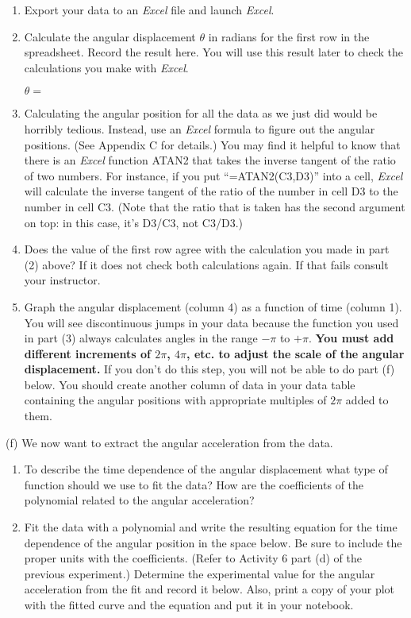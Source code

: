 \begin{enumerate}
\item Export your data to an \textit{Excel} file and launch 
\textit{Excel}.

\item Calculate the angular displacement \( \theta  \) in radians for the first row
in the spreadsheet. Record the result here.
You will use this result later to check the calculations you make with 
\textit{Excel}.


$\theta =$

\item Calculating the angular position for all the data as we just did
would be horribly tedious. Instead, use an {\it Excel} formula to
figure out the angular positions.  (See Appendix C for details.)
You may find it helpful to know that there is an {\it Excel} function
ATAN2 that takes the inverse tangent of the ratio of two numbers.
For instance, if you put ``=ATAN2(C3,D3)'' into a cell, {\it Excel}
will calculate the inverse tangent of the ratio of the number
in cell D3 to the number in cell C3.  (Note that the ratio
that is taken has the second argument on top: in this case, it's 
D3/C3, not C3/D3.)

\item Does the value of the first row agree with the calculation you made in part
(2) above? If it does not check both calculations again. If that fails consult
your instructor. 
\item Graph the angular displacement (column 4) as a function of time (column 1).
You will see discontinuous jumps in your data because the function you used
in part (3) always calculates angles in the range \( -\pi  \) to \( +\pi  \).
\textbf{You must add different increments of \( 2\pi  \), \(4 \pi  \), etc. to adjust
the scale of the angular displacement.} If you don't do this step, you will not be able to do part (f) below.  You should create another
column of data in your data table containing the angular positions with
appropriate multiples of $2\pi$ added to them.
\end{enumerate}
(f) We now want to extract the angular acceleration from the data.

\begin{enumerate}
\item To describe the time dependence of the angular displacement what type of function should we use to fit the data? How are the coefficients of the polynomial related to the angular acceleration?\vspace{20mm}

\item Fit the data with a polynomial and write the resulting equation for the time
dependence of the angular position in the space below. Be sure to include the
proper units with the coefficients. (Refer to Activity 6 part (d) of the previous experiment.) Determine the experimental value for the
angular acceleration from the fit and record it below. Also, print a copy of
your plot with the fitted curve and the equation and put it in your notebook.\vspace{20mm}

\end{enumerate}


